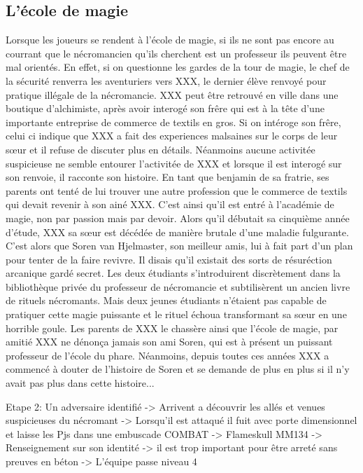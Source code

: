 

\subsection{L'école de magie}

Lorsque les joueurs se rendent à l'école de magie, si ils ne sont pas encore au courrant que le nécromancien
qu'ils cherchent est un professeur ils peuvent être mal orientés. En effet, si on questionne les gardes de
la tour de magie, le chef de la sécurité renverra les aventuriers vers XXX, le dernier élève renvoyé 
pour pratique illégale de la nécromancie. XXX peut être retrouvé en ville dans une boutique d'alchimiste,
après avoir interogé son frêre qui est à la tête d'une importante
entreprise de commerce de textils en gros. Si on intéroge son frêre, celui ci indique que XXX a fait des 
experiences malsaines sur le corps de leur s\oe{}ur et il refuse de discuter plus en détails. Néanmoins 
aucune activitée suspicieuse ne semble entourer l'activitée de XXX et 
lorsque il est interogé sur son renvoie, il racconte son histoire. En tant que benjamin de sa fratrie, ses
parents ont tenté de lui trouver une autre profession que le commerce de textils qui devait revenir à son 
ainé XXX. C'est ainsi qu'il est entré à l'académie de magie, non par passion mais par devoir. Alors qu'il
débutait sa cinquième année d'étude, XXX sa s\oe{}ur est décédée de manière brutale d'une maladie 
fulgurante. C'est alors que Soren van Hjelmaster, son meilleur amis, lui à fait part d'un plan pour
tenter de la faire revivre. Il disais qu'il existait des sorts de résuréction arcanique gardé secret. Les
deux étudiants s'introduirent discrètement dans la bibliothèque privée du professeur de nécromancie et 
subtilisèrent un ancien livre de rituels nécromants. Mais deux jeunes étudiants n'étaient pas capable
de pratiquer cette magie puissante et le rituel échoua transformant sa s\oe{}ur en une horrible goule. 
Les parents de XXX le chassère ainsi que l'école de magie, par amitié XXX ne dénonça jamais son ami Soren,
qui est à présent un puissant professeur de l'école du phare. Néanmoins, depuis toutes ces années XXX
a commencé à douter de l'histoire de Soren et se demande de plus en plus si il n'y avait pas plus dans 
cette histoire...

Etape 2: Un adversaire identifié
 -> Arrivent a découvrir les allés et venues suspicieuses du nécromant
 -> Lorsqu'il est attaqué il fuit avec porte dimensionnel et laisse les Pjs dans une embuscade COMBAT -> Flameskull MM134
 -> Renseignement sur son identité -> il est trop important pour être arreté sans preuves en béton
 -> L'équipe passe niveau 4

